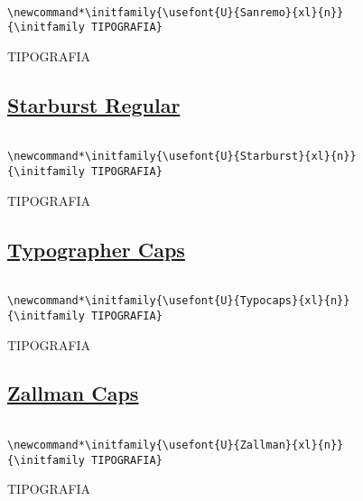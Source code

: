 \documentclass[a4paper]{article}
\newcommand{\tipo}{TIPOGRAFIA}
\begin{document}
\begin{verbatim}

\newcommand*\initfamily{\usefont{U}{Sanremo}{xl}{n}}
{\initfamily TIPOGRAFIA}
\end{verbatim}

{\initfamily\Huge \tipo}



\subsection*{\href{http://www.tug.dk/FontCatalogue/starburst/}{Starburst Regular}}


\renewcommand*\initfamily{\usefont{U}{Starburst}{xl}{n}}

\begin{verbatim}

\newcommand*\initfamily{}
{\initfamily TIPOGRAFIA}
\end{verbatim}

{\initfamily\Huge \tipo}



\subsection*{\href{http://www.tug.dk/FontCatalogue/typocaps/}{Typographer Caps}}


\renewcommand*\initfamily{\usefont{U}{Typocaps}{xl}{n}}

\begin{verbatim}

\newcommand*\initfamily{}
{\initfamily TIPOGRAFIA}
\end{verbatim}

{\initfamily\Huge \tipo}




\subsection*{\href{http://www.tug.dk/FontCatalogue/zallman/}{Zallman Caps}}


\renewcommand*\initfamily{\usefont{U}{Zallman}{xl}{n}}

\begin{verbatim}

\newcommand*\initfamily{}
{\initfamily TIPOGRAFIA}
\end{verbatim}

{\initfamily\Huge \tipo}
\end{document}
